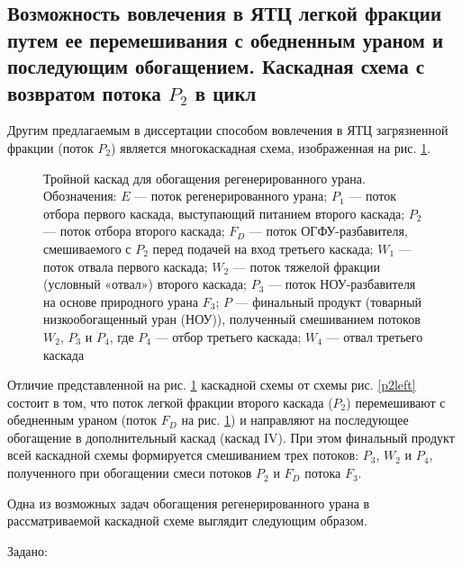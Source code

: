 \subsection{Возможность вовлечения в ЯТЦ легкой фракции путем ее перемешивания с обедненным ураном и последующим обогащением. Каскадная схема с возвратом потока $P_2$ в цикл}\label{triple_c}

Другим предлагаемым в диссертации способом вовлечения в ЯТЦ загрязненной фракции (поток $P_2$) является многокаскадная схема, изображенная на рис. \ref{p2_withDepU}.

\begin{figure}[ht]
    \caption{Тройной каскад для обогащения регенерированного урана. Обозначения: $E$ --- поток регенерированного урана; $P_1$ --- поток отбора первого каскада, выступающий питанием второго каскада; $P_2$ --- поток отбора второго каскада; $F_{D}$ --- поток ОГФУ-разбавителя, смешиваемого с $P_2$ перед подачей на вход третьего каскада; $W_1$ --- поток отвала первого каскада; $W_2$ --- поток тяжелой фракции (условный «отвал») второго каскада; $P_3$ --- поток НОУ-разбавителя на основе природного урана $F_3$; $P$ --- финальный продукт (товарный низкообогащенный уран (НОУ)), полученный смешиванием потоков $W_2$, $P_3$ и $P_4$, где $P_4$ --- отбор третьего каскада; $W_4$ --- отвал третьего каскада}\label{p2_withDepU}
\end{figure}

Отличие представленной на рис. \ref{p2_withDepU} каскадной схемы от схемы рис. \ref{p2left} состоит в том, что поток легкой фракции второго каскада ($P_2$) перемешивают с обедненным ураном (поток $F_{D}$ на рис. \ref{p2_withDepU}) и направляют на последующее обогащение в дополнительный каскад (каскад IV). При этом финальный продукт всей каскадной схемы формируется смешиванием трех потоков: $P_3$, $W_2$ и $P_4$, полученного при обогащении смеси потоков $P_2$ и $F_{D}$ потока $F_3$.

Одна из возможных задач обогащения регенерированного урана в рассматриваемой каскадной схеме выглядит следующим образом.

Задано:

